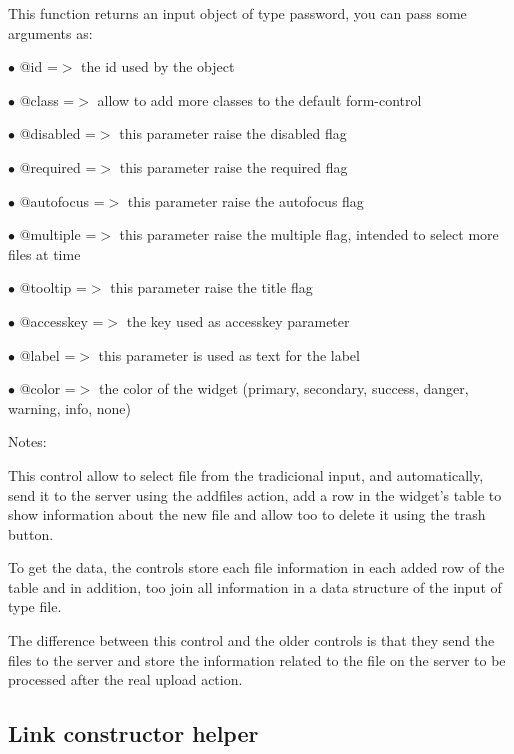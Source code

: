 \documentclass[a4paper]{book}
\begin{document}
This function returns an input object of type password, you can pass some arguments as:

\begin{compactitem}
\item[\color{myblue}$\bullet$] @id        =$>$ the id used by the object
\item[\color{myblue}$\bullet$] @class     =$>$ allow to add more classes to the default form-control
\item[\color{myblue}$\bullet$] @disabled  =$>$ this parameter raise the disabled flag
\item[\color{myblue}$\bullet$] @required  =$>$ this parameter raise the required flag
\item[\color{myblue}$\bullet$] @autofocus =$>$ this parameter raise the autofocus flag
\item[\color{myblue}$\bullet$] @multiple  =$>$ this parameter raise the multiple flag, intended to select more files at time
\item[\color{myblue}$\bullet$] @tooltip   =$>$ this parameter raise the title flag
\item[\color{myblue}$\bullet$] @accesskey =$>$ the key used as accesskey parameter
\item[\color{myblue}$\bullet$] @label     =$>$ this parameter is used as text for the label
\item[\color{myblue}$\bullet$] @color     =$>$ the color of the widget (primary, secondary, success, danger, warning, info, none)
\end{compactitem}

Notes:

This control allow to select file from the tradicional input, and automatically, send it
to the server using the addfiles action, add a row in the widget's table to show information
about the new file and allow too to delete it using the trash button.

To get the data, the controls store each file information in each added row of the table and
in addition, too join all information in a data structure of the input of type file.

The difference between this control and the older controls is that they send the files to
the server and store the information related to the file on the server to be processed after
the real upload action.

\hypertarget{toc479}{}
\subsection{Link constructor helper}
\end{document}
